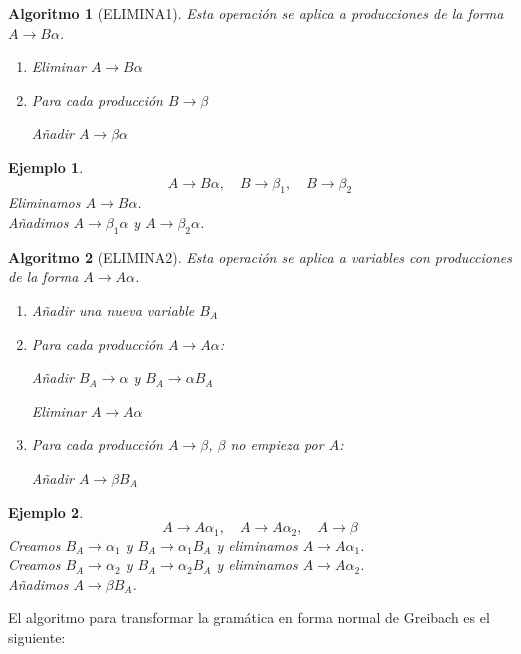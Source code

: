 \documentclass[11pt,titlepage,a4paper]{article}
\theoremstyle{ejemplo}
\newtheorem*{eje}{Ejemplo} %
\theoremstyle{algoritmo}
\newtheorem*{alg}{Algoritmo} %
\begin{document}
\begin{alg}[ELIMINA1]
Esta operación se aplica a producciones de la forma $A\to B\alpha$.
\begin{enumerate}[noitemsep]
	\item Eliminar $A\to B\alpha$
	\item Para cada producción $B\to\beta$
	
	\quad\quad Añadir $A\to\beta\alpha$
\end{enumerate}
\end{alg}

\begin{eje}
$$A\to B\alpha,\quad B\to\beta_1,\quad B\to\beta_2$$
Eliminamos $A\to B\alpha$.\\
Añadimos $A\to\beta_1\alpha$ y $A\to\beta_2\alpha$.
\end{eje}

\begin{alg}[ELIMINA2]
Esta operación se aplica a variables con producciones de la forma $A\to A\alpha$.
\begin{enumerate}[noitemsep]
	\item Añadir una nueva variable $B_A$
	\item Para cada producción $A\to A\alpha$:
	
	\quad\quad Añadir $B_A\to\alpha$ y $B_A\to\alpha B_A$
	
	\quad\quad Eliminar $A\to A\alpha$
	\item Para cada producción $A\to\beta$, $\beta$ no empieza por $A$:
	
	\quad\quad Añadir $A\to\beta B_A$
\end{enumerate}
\end{alg}

\begin{eje}
$$A\to A\alpha_1,\quad A\to A\alpha_2,\quad A\to\beta$$
Creamos $B_A\to \alpha_1$ y $B_A\to \alpha_1 B_A$ y eliminamos $A\to A\alpha_1$.
\\
Creamos $B_A\to \alpha_2$ y $B_A\to \alpha_2 B_A$ y eliminamos $A\to A\alpha_2$.
\\
Añadimos $A\to\beta B_A$.
\end{eje}

El algoritmo para transformar la gramática en forma normal de Greibach es el
siguiente:
\end{document}
